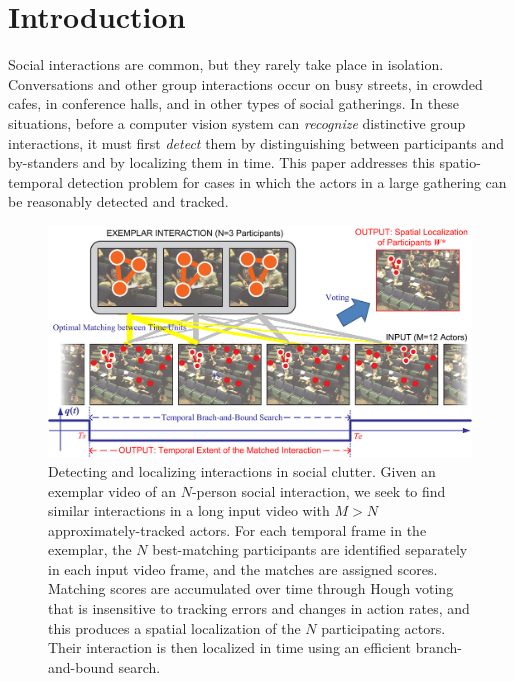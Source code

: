 \section{Introduction}

Social interactions are common, but they rarely take place in isolation. Conversations and other group interactions occur on busy streets, in crowded cafes, in conference halls, and in other types of social gatherings. In these situations, before a computer vision system can \emph{recognize} distinctive group interactions, it must first \emph{detect} them by distinguishing between participants and by-standers and by localizing them in time. This paper addresses this spatio-temporal detection problem for cases in which the actors in a large gathering can be reasonably detected and tracked.

\begin{figure}[t]
\begin{center}
\includegraphics[width=\columnwidth]{diagram2.png}
\end{center}
\caption{Detecting and localizing interactions in social clutter. Given an exemplar video of an $N$-person social interaction, we seek to find similar interactions in a long input video with $M>N$ approximately-tracked actors. For each temporal frame in the exemplar, the $N$ best-matching participants are identified separately in each input video frame, and the matches are assigned scores. Matching scores are accumulated over time through Hough voting that is insensitive to tracking errors and changes in action rates, and this produces a spatial localization of the $N$ participating actors. Their interaction is then localized in time using an efficient branch-and-bound search.}
\label{diagram}
\end{figure}


